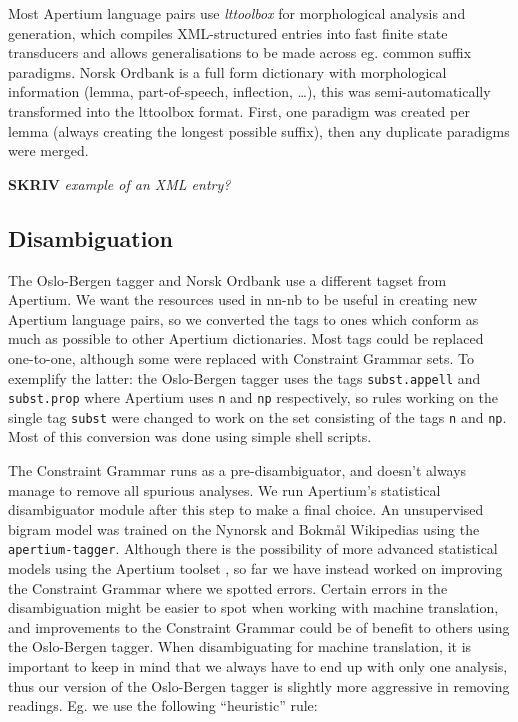 \documentclass[11pt]{article}
\newcommand{\comment}[1]{\textbf{SKRIV} {\it #1}}
\begin{document}
Most Apertium language pairs use \emph{lttoolbox} for morphological
analysis and generation, which compiles XML-structured entries into
fast finite state transducers and allows generalisations to be made
across eg. common suffix paradigms. Norsk Ordbank is a full form
dictionary with morphological information (lemma, part-of-speech,
inflection, \ldots{}), this was semi-automatically transformed into
the lttoolbox format. First, one paradigm was created per lemma
(always creating the longest possible suffix), then any duplicate
paradigms were merged. 

\comment{ example of an XML entry?\\}


\subsection{Disambiguation}

The Oslo-Bergen tagger and Norsk Ordbank use a different tagset from
Apertium. We want the resources used in nn-nb to be useful in creating
new Apertium language pairs, so we converted the tags to ones which
conform as much as possible to other Apertium dictionaries. Most tags
could be replaced one-to-one, although some were replaced with
Constraint Grammar sets. To exemplify the latter: the Oslo-Bergen
tagger uses the tags {\tt subst.appell} and
{\tt subst.prop} where Apertium uses {\tt n} and
{\tt np} respectively, so rules working on the single tag
{\tt subst} were changed to work on the set consisting of the
tags {\tt n} and {\tt np}. Most of this conversion was done
using simple shell scripts.

The Constraint Grammar runs as a pre-disambiguator, and doesn't always
manage to remove all spurious analyses. We run Apertium's statistical
disambiguator module after this step to make a final choice. An
unsupervised bigram model was trained on the Nynorsk and Bokmål
Wikipedias using the {\tt apertium-tagger}. Although there is the
possibility of more advanced statistical models using the Apertium
toolset \citep[see~eg.~][]{sanchez2008utl,sheikh2009trigram}, so far
we have instead worked on improving the Constraint Grammar where we
spotted errors. Certain errors in the disambiguation might be easier
to spot when working with machine translation, and improvements to the
Constraint Grammar could be of benefit to others using the Oslo-Bergen
tagger. When disambiguating for machine translation, it is important
to keep in mind that we always have to end up with only one analysis,
thus our version of the Oslo-Bergen tagger is slightly more aggressive
in removing readings. Eg. we use the following ``heuristic'' rule:
\end{document}
